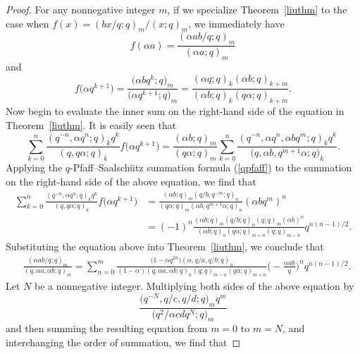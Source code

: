 \documentclass[10pt,a4paper]{amsart}
\numberwithin{equation}{section}
\begin{document}
\begin{proof} For any nonnegative integer $m$, if we specialize Theorem~\ref{liuthm} to the case when $f(x)=(bx/q; q)_m/{(x; q)_m}$, we immediately have
\begin{equation*}%
f(\alpha a)=\frac{(\alpha ab/q; q)_m}{(\alpha a; q)_m}
\end{equation*}	
and
\begin{equation*}%
f\bigl(\alpha q^{k+1}\bigr)=\frac{\bigl(\alpha bq^{k}; q \bigr)_m}{\bigl(\alpha q^{k+1}; q\bigr)_m}=\frac{(\alpha q; q)_k (\alpha b;q)_{k+m}}{(\alpha b; q)_k (q\alpha ; q)_{k+m}}.	
\end{equation*}	
Now begin to evaluate the inner sum on the right-hand side of the equation in Theorem~\ref{liuthm}. It is easily seen that
\begin{equation*}%
\sum_{k=0}^n \frac{(q^{-n}, \alpha q^n; q)_k q^k}
{(q, q\alpha; q)_k} f\bigl(\alpha q^{k+1}\bigr)
=\frac{(\alpha b; q)_m}{(q\alpha; q)_m}
\sum_{k=0}^n \frac{(q^{-n}, \alpha q^n, \alpha b q^m; q)_k q^k}
{\bigl(q, \alpha b, q^{m+1}\alpha; q\bigr)_k}.
\end{equation*}
Applying the $q$-Pfaff--Saalsch\"{u}tz summation formula (\ref{qpfaff}) to the summation on the right-hand side of the above equation, we find that
\begin{align*}%
\sum_{k=0}^n \frac{(q^{-n}, \alpha q^n; q)_k q^k}
{(q, q\alpha; q)_k} f\bigl(\alpha q^{k+1}\bigr)&{}=\frac{(\alpha b; q)_m (q/b, q^{-m}; q)_n}{(q\alpha; q)_m
(\alpha b, q^{m+1}\alpha; q)_n} (\alpha b q^m)^n\\
&{}=(-1)^n \frac{(\alpha b; q)_m (q/b; q)_n (q; q)_m(\alpha b)^n}{(\alpha b; q)_n (q\alpha; q)_{m+n} (q; q)_{m-n}} q^{n(n-1)/2}.\nonumber
\end{align*}
Substituting the equation above into Theorem~\ref{liuthm}, we conclude that
\begin{align*}%
&\frac{(\alpha ab/q; q)_m}{(q, \alpha a, \alpha b; q)_m}
=\sum_{n=0}^m \frac{\bigl(1-\alpha q^{2n}\bigr) (\alpha, q/a, q/b; q)_n}{(1-\alpha)(q, \alpha a, \alpha b; q)_n (q; q)_{m-n} (q\alpha; q)_{m+n}}\biggl(-\frac{\alpha ab}{q}\biggr)^n q^{n(n-1)/2}. \nonumber
\end{align*}
Let $N$ be a nonnegative integer. Multiplying both sides of the above equation by
\[
\frac{\bigl(q^{-N}, q/c, q/d; q\bigr)_m q^m}{\bigl(q^2/\alpha cdq^N; q\bigr)_m}
\]
and then summing the resulting equation from $m=0$ to $m=N$, and interchanging the order of summation, we find that

\end{proof}
\end{document}
